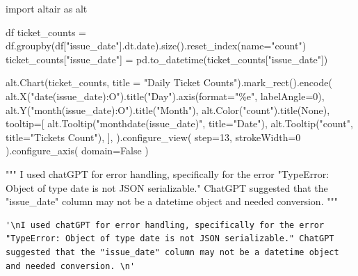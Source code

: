 \documentclass[
  letterpaper,
  DIV=11,
  numbers=noendperiod]{scrartcl}
\newenvironment{Shaded}{\begin{snugshade}}{\end{snugshade}}
\newcommand{\BuiltInTok}[1]{\textcolor[rgb]{0.00,0.23,0.31}{#1}}
\newcommand{\CommentTok}[1]{\textcolor[rgb]{0.37,0.37,0.37}{#1}}
\newcommand{\DecValTok}[1]{\textcolor[rgb]{0.68,0.00,0.00}{#1}}
\newcommand{\ImportTok}[1]{\textcolor[rgb]{0.00,0.46,0.62}{#1}}
\newcommand{\NormalTok}[1]{\textcolor[rgb]{0.00,0.23,0.31}{#1}}
\newcommand{\OperatorTok}[1]{\textcolor[rgb]{0.37,0.37,0.37}{#1}}
\newcommand{\SpecialCharTok}[1]{\textcolor[rgb]{0.37,0.37,0.37}{#1}}
\newcommand{\StringTok}[1]{\textcolor[rgb]{0.13,0.47,0.30}{#1}}
\newcommand{\VariableTok}[1]{\textcolor[rgb]{0.07,0.07,0.07}{#1}}
\begin{document}
\begin{Shaded}
\begin{Highlighting}[]
\ImportTok{import}\NormalTok{ altair }\ImportTok{as}\NormalTok{ alt}

\NormalTok{df}
\NormalTok{ticket\_counts }\OperatorTok{=}\NormalTok{ df.groupby(df[}\StringTok{"issue\_date"}\NormalTok{].dt.date).size().reset\_index(name}\OperatorTok{=}\StringTok{"count"}\NormalTok{)}
\NormalTok{ticket\_counts[}\StringTok{"issue\_date"}\NormalTok{] }\OperatorTok{=}\NormalTok{ pd.to\_datetime(ticket\_counts[}\StringTok{"issue\_date"}\NormalTok{])}

\NormalTok{alt.Chart(ticket\_counts, title }\OperatorTok{=} \StringTok{"Daily Ticket Counts"}\NormalTok{).mark\_rect().encode(}
\NormalTok{    alt.X(}\StringTok{"date(issue\_date):O"}\NormalTok{).title(}\StringTok{"Day"}\NormalTok{).axis(}\BuiltInTok{format}\OperatorTok{=}\StringTok{"}\SpecialCharTok{\%e}\StringTok{"}\NormalTok{, labelAngle}\OperatorTok{=}\DecValTok{0}\NormalTok{),}
\NormalTok{    alt.Y(}\StringTok{"month(issue\_date):O"}\NormalTok{).title(}\StringTok{"Month"}\NormalTok{),}
\NormalTok{    alt.Color(}\StringTok{"count"}\NormalTok{).title(}\VariableTok{None}\NormalTok{),}
\NormalTok{    tooltip}\OperatorTok{=}\NormalTok{[}
\NormalTok{        alt.Tooltip(}\StringTok{"monthdate(issue\_date)"}\NormalTok{, title}\OperatorTok{=}\StringTok{"Date"}\NormalTok{),}
\NormalTok{        alt.Tooltip(}\StringTok{"count"}\NormalTok{, title}\OperatorTok{=}\StringTok{"Tickets Count"}\NormalTok{),}
\NormalTok{    ],}
\NormalTok{).configure\_view(}
\NormalTok{    step}\OperatorTok{=}\DecValTok{13}\NormalTok{,}
\NormalTok{    strokeWidth}\OperatorTok{=}\DecValTok{0}
\NormalTok{).configure\_axis(}
\NormalTok{    domain}\OperatorTok{=}\VariableTok{False}
\NormalTok{)}

\CommentTok{"""}
\CommentTok{I used chatGPT for error handling, specifically for the error "TypeError: Object of type date is not JSON serializable." ChatGPT suggested that the "issue\_date" column may not be a datetime object and needed conversion. }
\CommentTok{"""}
\end{Highlighting}
\end{Shaded}

\begin{verbatim}
'\nI used chatGPT for error handling, specifically for the error "TypeError: Object of type date is not JSON serializable." ChatGPT suggested that the "issue_date" column may not be a datetime object and needed conversion. \n'
\end{verbatim}
\end{document}
